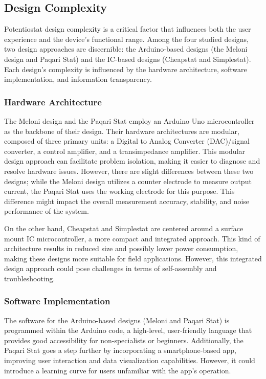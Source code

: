 \documentclass{article}
\begin{document}
\subsection*{Design Complexity}
Potentiostat design complexity is a critical factor that influences both the user experience and the device's functional range. Among the four studied designs, two design approaches are discernible: the Arduino-based designs (the Meloni design and Paqari Stat) and the IC-based designs (Cheapstat and Simplestat). Each design's complexity is influenced by the hardware architecture, software implementation, and information transparency.

\subsubsection*{Hardware Architecture}
The Meloni design and the Paqari Stat employ an Arduino Uno microcontroller as the backbone of their design. Their hardware architectures are modular, composed of three primary units: a Digital to Analog Converter (DAC)/signal converter, a control amplifier, and a transimpedance amplifier. This modular design approach can facilitate problem isolation, making it easier to diagnose and resolve hardware issues. However, there are slight differences between these two designs; while the Meloni design utilizes a counter electrode to measure output current, the Paqari Stat uses the working electrode for this purpose. This difference might impact the overall measurement accuracy, stability, and noise performance of the system.

On the other hand, Cheapstat and Simplestat are centered around a surface mount IC microcontroller, a more compact and integrated approach. This kind of architecture results in reduced size and possibly lower power consumption, making these designs more suitable for field applications. However, this integrated design approach could pose challenges in terms of self-assembly and troubleshooting.

\subsubsection*{Software Implementation}
The software for the Arduino-based designs (Meloni and Paqari Stat) is programmed within the Arduino code, a high-level, user-friendly language that provides good accessibility for non-specialists or beginners. Additionally, the Paqari Stat goes a step further by incorporating a smartphone-based app, improving user interaction and data visualization capabilities. However, it could introduce a learning curve for users unfamiliar with the app's operation.
\end{document}
